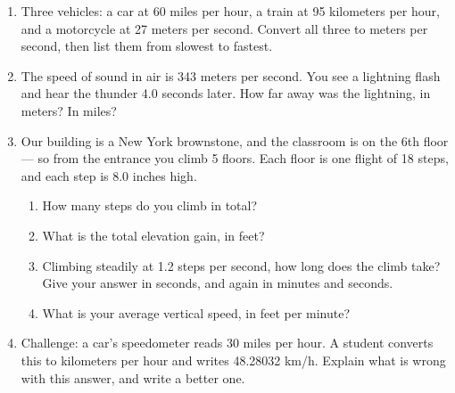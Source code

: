 \documentclass[12pt, twoside]{article}
\begin{document}
\begin{enumerate}[itemsep=0.4cm]
\newpage

\item Three vehicles: a car at 60 miles per hour, a train at 95 kilometers per hour, and a motorcycle at 27 meters per second. Convert all three to meters per second, then list them from slowest to fastest.

\vspace{8.5cm}

\item The speed of sound in air is 343 meters per second. You see a lightning flash and hear the thunder 4.0 seconds later. How far away was the lightning, in meters? In miles?

\vspace{8.0cm}

\newpage

\item Our building is a New York brownstone, and the classroom is on the 6th floor --- so from the entrance you climb 5 floors. Each floor is one flight of 18 steps, and each step is 8.0 inches high.
  \begin{enumerate}[itemsep=2.6cm]
    \item How many steps do you climb in total?
    \item What is the total elevation gain, in feet?
    \item Climbing steadily at 1.2 steps per second, how long does the climb take? Give your answer in seconds, and again in minutes and seconds.
    \item What is your average vertical speed, in feet per minute?
  \end{enumerate} \vspace{2.6cm}

\item Challenge: a car's speedometer reads 30 miles per hour. A student converts this to kilometers per hour and writes 48.28032 km/h. Explain what is wrong with this answer, and write a better one.

\vspace{4.0cm}

\end{enumerate}
\end{document}
